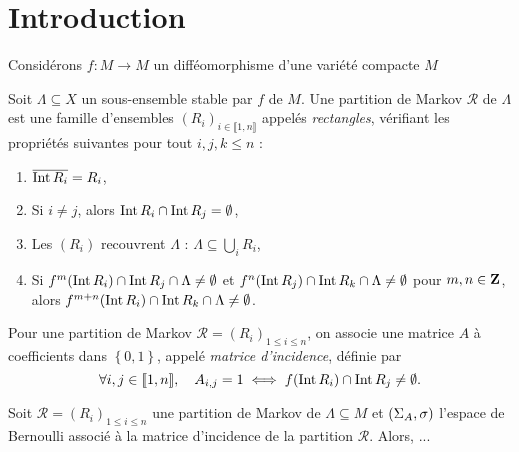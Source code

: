 \section{Introduction}

Considérons $f \colon M \longrightarrow M$ un difféomorphisme d'une variété compacte $M$

\begin{definition}
  Soit $\Lambda \subseteq X$ un sous-ensemble stable par $f$ de $M$.
  Une partition de Markov $\mathcal R$ de $\Lambda$ est une famille d'ensembles $(R_i)_{i \in \llbracket 1, n\rrbracket}$ appelés \textit{rectangles},
  vérifiant les propriétés suivantes pour tout $i, j, k \leq n$ :
  \begin{enumerate}
    \item $\overline{\operatorname{Int}{R_i}} = R_i$,
    \item Si $i \not= j$, alors $\operatorname{Int}{R_i} \cap \operatorname{Int}{R_j} = \emptyset$,
    \item Les $(R_i)$ recouvrent $\Lambda$ : $\Lambda \subseteq \bigcup_i{R_i}$,
    \item Si $f^m(\operatorname{Int}{R_i}) \cap \operatorname{Int}{R_j} \cap \Lambda \not= \emptyset$ et $f^n(\operatorname{Int}{R_j})\cap \operatorname{Int}{R_k} \cap \Lambda \not= \emptyset$
      pour $m,n \in \mathbf Z$, alors $f^{m+n}(\operatorname{Int}{R_i})\cap \operatorname{Int}{R_k} \cap \Lambda \not= \emptyset$.
  \end{enumerate}

  Pour une partition de Markov $\mathcal R = (R_i)_{1 \leq i \leq n}$,
  on associe une matrice $A$ à coefficients dans $\left\{0, 1\right\}$, appelé \textit{matrice d'incidence}, définie par
  $$\forall i,j \in \llbracket 1, n\rrbracket, \hspace{1em} A_{i,j} = 1 \iff f(\operatorname{Int}{R_i}) \cap \operatorname{Int}{R_j} \not= \emptyset.$$
\end{definition}

\begin{theorem}
  Soit $\mathcal R = (R_i)_{1\leq i\leq n}$ une partition de Markov de $\Lambda \subseteq M$ et $(\Sigma_A, \sigma)$ l'espace
  de Bernoulli associé à la matrice d'incidence de la partition $\mathcal R$.
  Alors, ...
\end{theorem}
